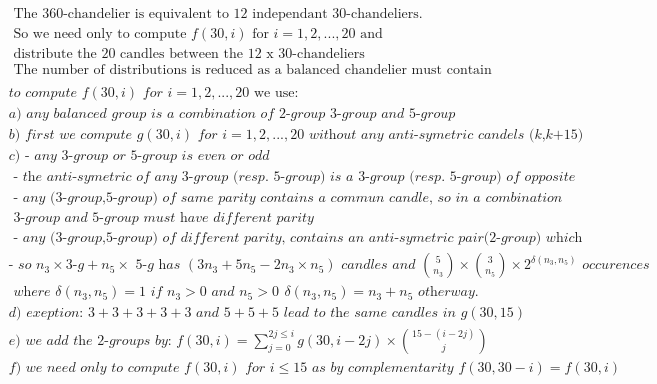 \documentclass[10pt,a4paper]{letter}
\begin{document}
\begin{align*}
&\text{ The 360-chandelier is equivalent to 12 independant 30-chandeliers. }\\
&\text{ So we need only to compute }f(30,i)\text{ for }i=1,2,...,20\text{ and}\\
&\text{ distribute the 20 candles between the 12 x 30-chandeliers } \\
&\text{ The number of distributions is reduced as a balanced chandelier must contain 2 or more candles.}\\ 
\end{align*}
\begin{align*}
	&\textit{to compute }f(30,i)\textit{ for }i=1,2,...,20 \text{ we use:}\\
	&\textit{a) any balanced group is a combination of 2-group 3-group and 5-group}\\
	&\textit{b) first we compute }g(30,i)\textit{ for }i=1,2,...,20 \textit{ without any anti-symetric candels (k,k+15) }\\
	&\textit{c)  - any 3-group or 5-group is even or odd }\\
	&\textit{    - the anti-symetric of any 3-group (resp. 5-group) is a 3-group (resp. 5-group) of opposite parity}\\
	&\textit{    - any (3-group,5-group) of same parity contains a commun candle, so in a combination}\\
	&\textit{      3-group and 5-group must have different parity}\\
	&\textit{    - any (3-group,5-group) of different parity, contains an anti-symetric pair(2-group) which must be removed}\\
	&\textit{- so }n_{3}\times \textit{3-g}+n_{5}\times \textit{ 5-g has }(3n_{3}+5n_{5}-2n_{3}\times n_{5}) \textit{ candles and }
	{5 \choose n_{3}}\times {3 \choose n_{5}}\times 2^{\delta(n_{3},n_{5})}\textit{ occurences}\\
	&\textit{ where }\delta(n_{3},n_{5})=1\textit{ if }n_{3}>0\textit{ and }n_{5}>0\ \,  \delta(n_{3},n_{5})=n_{3}+n_{5}\textit{ otherway.}\\
	&\textit{d) exeption: }3+3+3+3+3\textit{ and }5+5+5\textit{ lead to the same candles in }g(30,15)  \\
	&\textit{e) we add the 2-groups by: }f(30,i)=\sum_{j=0}^{2j\leq i}g(30,i-2j)\times { 15-(i-2j)\choose j}\\
	&\textit{f) we need only to compute }f(30,i)\textit{ for }i \leq 15 \textit{ as by complementarity }f(30,30-i)=f(30,i)\\			
\end{align*}
\end{document}
